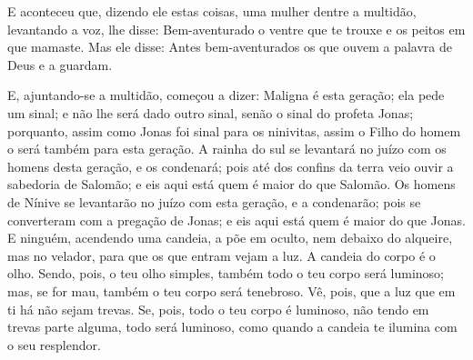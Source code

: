 E aconteceu que, dizendo ele estas coisas, uma mulher dentre a
multidão, levantando a voz, lhe disse: Bem-aventurado o ventre que
te trouxe e os peitos em que mamaste. Mas ele disse: Antes
bem-aventurados os que ouvem a palavra de Deus e a guardam.

E, ajuntando-se a multidão, começou a dizer: Maligna é esta
geração; ela pede um sinal; e não lhe será dado outro sinal, senão o
sinal do profeta Jonas; porquanto, assim como Jonas foi sinal
para os ninivitas, assim o Filho do homem o será também para esta
geração. A rainha do sul se levantará no juízo com os homens
desta geração, e os condenará; pois até dos confins da terra veio
ouvir a sabedoria de Salomão; e eis aqui está quem é maior do que
Salomão. Os homens de Nínive se levantarão no juízo com esta
geração, e a condenarão; pois se converteram com a pregação de
Jonas; e eis aqui está quem é maior do que Jonas. E ninguém,
acendendo uma candeia, a põe em oculto, nem debaixo do alqueire, mas
no velador, para que os que entram vejam a luz. A candeia do
corpo é o olho. Sendo, pois, o teu olho simples, também todo o teu
corpo será luminoso; mas, se for mau, também o teu corpo será
tenebroso. Vê, pois, que a luz que em ti há não sejam trevas.
Se, pois, todo o teu corpo é luminoso, não tendo em trevas
parte alguma, todo será luminoso, como quando a candeia te ilumina
com o seu resplendor.

